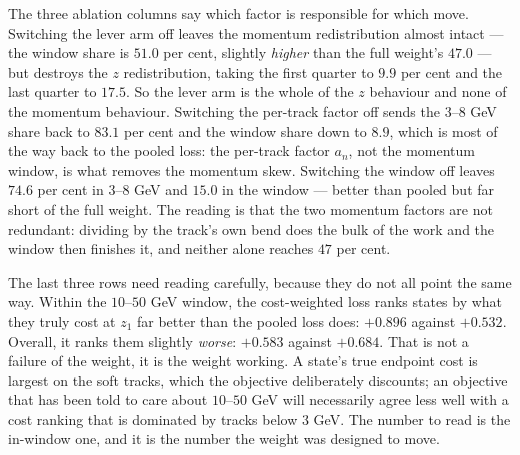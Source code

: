 \documentclass[11pt,a4paper]{article}
\begin{document}
The three ablation columns say which factor is responsible for which move.
Switching the lever arm off leaves the momentum redistribution almost intact
--- the window share is $51.0$ per cent, slightly \emph{higher} than the full
weight's $47.0$ --- but destroys the $z$ redistribution, taking the first
quarter to $9.9$ per cent and the last quarter to $17.5$. So the lever arm is
the whole of the $z$ behaviour and none of the momentum behaviour. Switching
the per-track factor off sends the $3$--$8$ GeV share back to $83.1$ per cent
and the window share down to $8.9$, which is most of the way back to the pooled
loss: the per-track factor $a_n$, not the momentum window, is what removes the
momentum skew. Switching the window off leaves $74.6$ per cent in $3$--$8$ GeV
and $15.0$ in the window --- better than pooled but far short of the full
weight. The reading is that the two momentum factors are not redundant: dividing
by the track's own bend does the bulk of the work and the window then finishes
it, and neither alone reaches $47$ per cent.

The last three rows need reading carefully, because they do not all point the
same way. Within the $10$--$50$ GeV window, the cost-weighted loss ranks states
by what they truly cost at $z_1$ far better than the pooled loss does: $+0.896$
against $+0.532$. Overall, it ranks them slightly \emph{worse}: $+0.583$
against $+0.684$. That is not a failure of the weight, it is the weight
working. A state's true endpoint cost is largest on the soft tracks, which the
objective deliberately discounts; an objective that has been told to care about
$10$--$50$ GeV will necessarily agree less well with a cost ranking that is
dominated by tracks below $3$ GeV. The number to read is the in-window one, and
it is the number the weight was designed to move.
\end{document}
